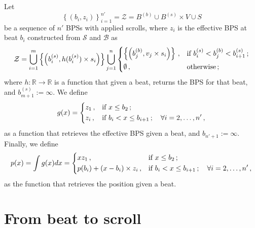 \documentclass[a4paper,9pt]{article}
\begin{document}
 Let  
    \begin{equation}
	    \left\{ \left( b_{i},z_{i} \right) \right\} _{i=1}^{n'} = \mathcal{Z} = B^{(b)} \cup B^{(s)}\times V \cup S
	    \label{eq:Z}
    \end{equation}
    be a sequence of $n'$ BPSs with applied scrolls, where $z_i$ is the effective BPS at beat $b_i$
    constructed from $\mathcal{S}$ and $\mathcal{B}$ as 
    \begin{equation}
	    \mathcal{Z} = \bigcup_{i=1}^{m} \left\{\left( b_i^{(s)},h(b_i^{(s)})\times s_i \right)\right\}\bigcup_{j=1}^{n} 
	    \begin{dcases}
		    \left\{ \left( b_j^{(b)}, v_j\times s_i \right)\right\}\,, & \text{if $b_i^{(s)} < b_j^{(b)} < b_{i+1}^{(s)}$}\,; \\
		    \emptyset\,, & \text{otherwise}\,;
	    \end{dcases}
	    \label{eq:Z-construction}
    \end{equation}
    where $h: \mathbb{R} \rightarrow \mathbb{R}$ is a function that given a beat, returns the BPS for that beat, and $b_{m+1}^{(s)} := \infty$.
    We define
    \begin{equation}
	    g(x) = \begin{dcases}
		    z_1\,, & \text{if $ x \leq b_2 $}\,;\\
		    z_i\,, & \text{if $ b_{i} < x \leq b_{i+1}\,; \quad \forall i=2,\dots,n'$}\,,
	    \end{dcases}
	    \label{eq:final-g}
    \end{equation}
    as a function that retrieves the effective BPS given a beat, and $ b_{n'+1}:= \infty $. Finally, we define 
    \begin{equation}
	    p(x) = \int g(x) dx = \begin{dcases}
		    xz_1\,, & \text{if $ x \leq b_2 $}\,;\\
		    p(b_i) + (x-b_i)\times z_i\,, & \text{if $ b_{i} < x \leq b_{i+1}\,; \quad \forall i=2,\dots,n'$}\,,
	    \end{dcases}
	    \label{eq:position-final}
    \end{equation}
    as the function that retrieves the position given a beat.
    \section{From beat to scroll}
\end{document}
